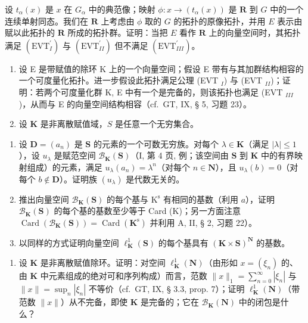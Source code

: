 设 \(t_{\alpha}(x)\) 是 \(x\) 在 \(G_{\alpha}\) 中的典范像；映射 \(\phi : x \to (t_{\alpha}(x))\) 是 \(\mathbf{R}\) 到 \(G\) 中的一个连续单射同态。我们在 \(\mathbf{R}\) 上考虑由 \(\phi\) 取的 \(G\) 的拓扑的原像拓扑，并用 \(E\) 表示由赋以此拓扑的 \(\mathbf{R}\) 所成的拓扑群。证明：当把 \(E\) 看作 \(\mathbf{R}\) 上的向量空间时，其拓扑满足 \((\mathrm{EVT}_{I}^{\prime})\) 与 \((\mathrm{EVT}_{II}^{\prime})\) 但不满足 \((\mathrm{EVT}_{III}^{\prime})\)。

\begin{enumerate}
\def\labelenumi{\arabic{enumi})}
\setcounter{enumi}{3}
\item
  设 E 是带赋值的除环 K 上的一个向量空间；假设 E 带有与其加群结构相容的一个可度量化拓扑。进一步假设此拓扑满足公理 (EVT \(_{I}\)) 与 (EVT \(_{II}\))；证明：若两个可度量化群 K, E 中有一个是完备的，则该拓扑也满足 (EVT \(_{III}\))，从而与 E 的向量空间结构相容（cf.~GT, IX, § 5, 习题 23）。
\item
  设 \(\mathbf{K}\) 是非离散赋值域，\(S\) 是任意一个无穷集合。
\end{enumerate}

\begin{enumerate}
\def\labelenumi{\alph{enumi})}
\item
  设 \(\mathbf{D} = (a_n)\) 是 \(\mathbf{S}\) 的元素的一个可数无穷族。对每个 \(\lambda \in \mathbf{K}\)（满足 \(|\lambda| \leqslant 1\)），设 \(u_{\lambda}\) 是赋范空间 \(\mathcal{B}_{\mathbf{K}}(\mathbf{S})\)（I, 第 4 页, 例；该空间由 \(\mathbf{S}\) 到 \(\mathbf{K}\) 中的有界映射组成）的元素，满足 \(u_{\lambda}(a_n) = \lambda^n\)（对每个 \(n \in \mathbf{N}\)），且 \(u_{\lambda}(b) = 0\)（对每个 \(b \notin \mathbf{D}\)）。证明族 \((u_{\lambda})\) 是代数无关的。
\item
  推出向量空间 \(\mathcal{B}_{\mathbf{K}}(\mathbf{S})\) 的每个基与 \(\mathrm{K}^{\mathrm{s}}\) 有相同的基数（利用 \(a\)），证明 \(\mathcal{B}_{\mathbf{K}}(\mathbf{S})\) 的每个基的基数至少等于 Card (K)；另一方面注意 \(\operatorname{Card}(\mathcal{B}_{\mathbf{K}}(\mathbf{S})) = \operatorname{Card}(\mathbf{K}^{\mathrm{s}})\) 并利用 A, II, § 2, 习题 22）。
\item
  以同样的方式证明向量空间 \(\ell_{\mathbf{K}}^{1}(\mathbf{S})\) 的每个基具有 \((\mathbf{K}\times \mathbf{S})^{\mathbf{N}}\) 的基数。
\end{enumerate}

\begin{enumerate}
\def\labelenumi{\arabic{enumi})}
\setcounter{enumi}{5}
\tightlist
\item
  设 \(\mathbf{K}\) 是非离散赋值除环。证明：对空间 \(\ell_{\mathbf{K}}^{1}(\mathbf{N})\)（由形如 \(x = (\xi_n)\) 的、由 \(\mathbf{K}\) 中元素组成的绝对可和序列构成）而言，范数 \(\| x \|_1 = \sum_{n=0}^{\infty} |\xi_n|\) 与 \(\| x \| = \sup_n |\xi_n|\) 不等价（cf.~GT, IX, § 3.3, prop. 7）；证明 \(\ell_{\mathbf{K}}^{1}(\mathbf{N})\)（带范数 \(\| x \|\)）从不完备，即使 \(\mathbf{K}\) 是完备的；它在 \(\mathcal{B}_{\mathbf{K}}(\mathbf{N})\) 中的闭包是什么？
\end{enumerate}

